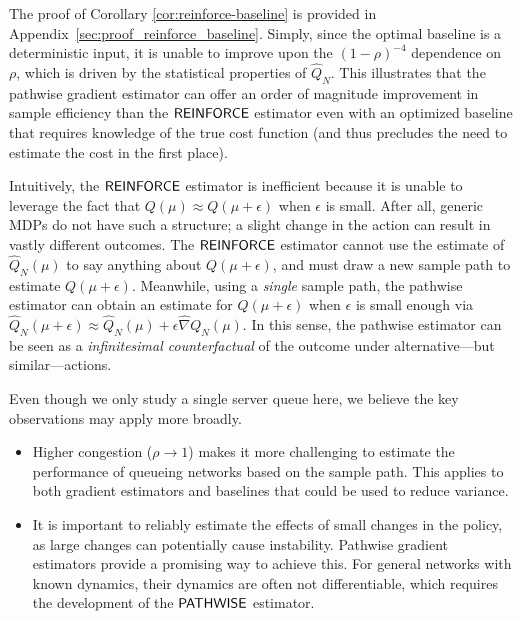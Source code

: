 The proof of Corollary \ref{cor:reinforce-baseline} is provided in Appendix~\ref{sec:proof_reinforce_baseline}.
Simply, since the optimal baseline is a deterministic input, it is unable to improve upon the $(1-\rho)^{-4}$ dependence on $\rho$, which is driven by the statistical properties of $\widehat{Q}_{N}$. 
This illustrates that the pathwise gradient estimator can offer an order of magnitude improvement in sample efficiency than the $\mathsf{REINFORCE}$ estimator even with an optimized baseline that requires knowledge of the true cost function (and thus precludes the need to estimate the cost in the first place). 

Intuitively, the $\mathsf{REINFORCE}$ estimator is inefficient because it is unable to leverage the fact that %
$Q(\mu) \approx Q(\mu + \epsilon)$ when $\epsilon$ is small. After all, generic MDPs do not have such a structure; a slight change in the action can result in vastly different outcomes. The $\mathsf{REINFORCE}$ estimator cannot use the estimate of $\widehat{Q}_{N}(\mu)$ to say anything about $Q(\mu + \epsilon)$, and must draw a new sample path to estimate $Q(\mu + \epsilon)$. Meanwhile, using a \emph{single} sample path, the pathwise estimator can obtain an estimate for $Q(\mu + \epsilon)$ when $\epsilon$ is small enough via $\widehat{Q}_{N}(\mu + \epsilon)\approx \widehat{Q}_{N}(\mu) + \epsilon\widehat{\nabla}Q_{N}(\mu)$. In this sense, the pathwise estimator can be seen as a \emph{infinitesimal counterfactual} of the outcome under alternative---but similar---actions.

Even though we only study a single server queue here, %
we believe the key observations may apply more broadly.
\begin{itemize}[itemsep=0pt]
\item Higher congestion ($\rho \to 1$) makes it more challenging to estimate the performance of queueing networks based on the sample path. This applies to both gradient estimators and baselines that could be used to reduce variance.
\item It is important to reliably estimate the effects of small changes in the policy, as large changes can potentially cause instability. Pathwise gradient estimators provide a promising way to achieve this. For general networks with known dynamics, their dynamics are often not differentiable, which requires the development of the $\mathsf{PATHWISE}$ estimator.
\end{itemize}

